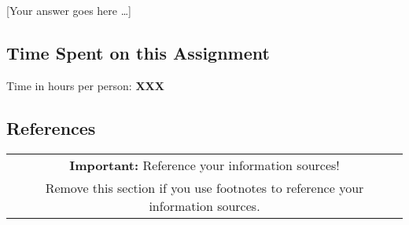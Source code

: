 \documentclass[11pt]{scrartcl}
\newcommand{\youranswerhere}{[Your answer goes here \ldots]}
\begin{document}
\youranswerhere{}

\subsection*{Time Spent on this Assignment}

Time in hours per person: \textbf{XXX}

\subsection*{References}

\begin{table}[H]
  \centering
  \begin{tabular}{c}
    \hline
    \textbf{Important:} Reference your information sources! \tabularnewline
    Remove this section if you use footnotes to reference your information sources. \tabularnewline
    \hline
  \end{tabular}
\end{table}
\end{document}
